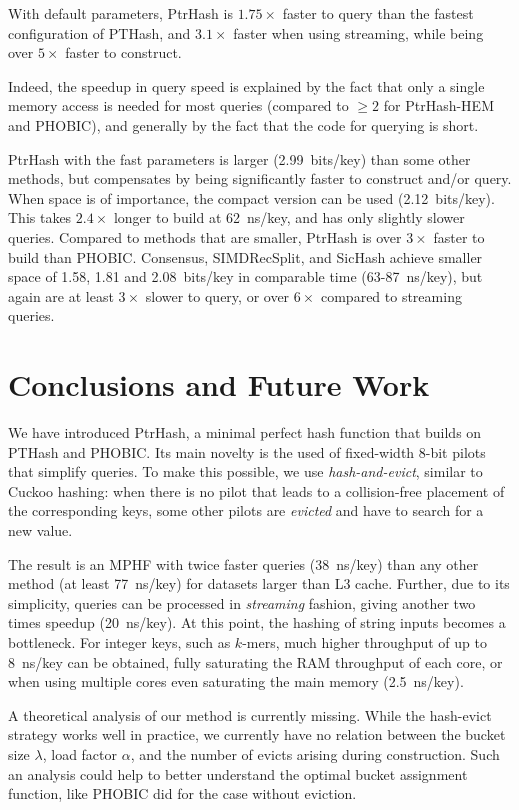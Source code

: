 \documentclass[a4paper,UKenglish,cleveref,thm-restate]{lipics-v2021}
\begin{document}
With default parameters, PtrHash is \(1.75\times\) faster to query than the
fastest configuration of PTHash, and \(3.1\times\) faster when using streaming,
while being over \(5\times\) faster to construct.

Indeed, the speedup in query speed is explained by the fact that only a single
memory access is needed for most queries (compared to \(\geq 2\) for PtrHash-HEM
and PHOBIC), and generally by the fact that the code for querying is short.

PtrHash with the fast parameters is larger (2.99~bits/key) than some other methods, but
compensates by being significantly faster to construct and/or query.
When space is of importance, the compact version can be used (2.12~bits/key).
This takes \(2.4\times\) longer to build at 62~ns/key, and has only slightly slower queries.
Compared to methods that are smaller,
PtrHash is over \(3\times\) faster to build than PHOBIC.
Consensus, SIMDRecSplit, and SicHash achieve smaller space of 1.58, 1.81 and 2.08~bits/key in
comparable time (63-87~ns/key), but again are at least \(3\times\) slower to query, or
over \(6\times\) compared to streaming queries.
\section{Conclusions and Future Work}
\label{sec:org5cb9a29}
We have introduced PtrHash, a minimal perfect hash function that builds on
PTHash and PHOBIC. Its main novelty is the used of fixed-width 8-bit pilots that
simplify queries. To make this possible, we use \emph{hash-and-evict}, similar to
Cuckoo hashing: when there is no pilot that leads to a collision-free placement
of the corresponding keys, some other pilots are \emph{evicted} and have to search
for a new value.

The result is an MPHF with twice faster queries (38~ns/key) than any other method
(at least 77~ns/key) for datasets larger than L3 cache. Further,
due to its simplicity, queries can be processed in \emph{streaming} fashion, giving
another two times speedup (20~ns/key). At this point, the hashing of string inputs becomes a
bottleneck. For integer keys, such as $k$-mers, much higher throughput of up to
8~ns/key can be obtained, fully saturating the RAM throughput of each core, or
when using multiple cores even saturating the main memory (2.5~ns/key).

A theoretical analysis of our method is currently missing. While
the hash-evict strategy works well in
practice, we currently have no relation between the bucket size \(\lambda\), load
factor \(\alpha\), and the number of evicts arising during construction.
Such an analysis could help to better understand the optimal bucket assignment
function, like PHOBIC \cite{phobic} did for the case without
eviction.
\end{document}
